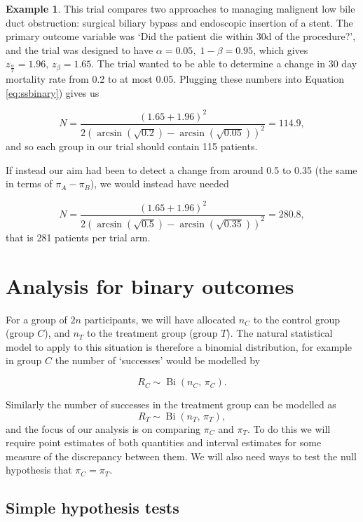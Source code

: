 \documentclass[
  openany]{book}
\theoremstyle{definition}
\theoremstyle{definition}
\newtheorem{example}{Example}[chapter]
\theoremstyle{definition}
\theoremstyle{definition}
\theoremstyle{remark}
\begin{document}
\begin{example}
\protect\hypertarget{exm:samplesize1}{}\label{exm:samplesize1}\citep[From][]{smith1994randomised}
This trial compares two approaches to managing malignent low bile duct obstruction: surgical biliary bypass and endoscopic insertion of a stent. The primary outcome variable was `Did the patient die within 30d of the procedure?', and the trial was designed to have \(\alpha=0.05,\;1-\beta=0.95\), which gives \(z_{\frac{\alpha}{2}}=1.96,\,z_{\beta} = 1.65\). The trial wanted to be able to determine a change in 30 day mortality rate from 0.2 to at most 0.05. Plugging these numbers into Equation \eqref{eq:ssbinary}) gives us

\[ N = \frac{\left(1.65 + 1.96\right)^2}{2\left(\arcsin{\left(\sqrt{0.2}\right)} - \arcsin{\left(\sqrt{0.05}\right)}\right)^2} = 114.9, \]
and so each group in our trial should contain 115 patients.

If instead our aim had been to detect a change from around 0.5 to 0.35 (the same in terms of \(\pi_A - \pi_B\)), we would instead have needed

\[ N = \frac{\left(1.65 + 1.96\right)^2}{2\left(\arcsin{\left(\sqrt{0.5}\right)} - \arcsin{\left(\sqrt{0.35}\right)}\right)^2} = 280.8 ,\]
that is 281 patients per trial arm.
\end{example}

\chapter{Analysis for binary outcomes}\label{binary-analysis}

For a group of \(2n\) participants, we will have allocated \(n_C\) to the control group (group \(C\)), and \(n_T\) to the treatment group (group \(T\)). The natural statistical model to apply to this situation is therefore a binomial distribution, for example in group \(C\) the number of `successes' would be modelled by

\[R_C \sim \operatorname{Bi}\left(n_C,\,\pi_C\right).\]

Similarly the number of successes in the treatment group can be modelled as
\[R_T \sim\operatorname{Bi}\left(n_T,\,\pi_T\right),\]
and the focus of our analysis is on comparing \(\pi_C\) and \(\pi_T\). To do this we will require point estimates of both quantities and interval estimates for some measure of the discrepancy between them. We will also need ways to test the null hypothesis that \(\pi_C = \pi_T.\)

\section{Simple hypothesis tests}\label{bin-point-est}
\end{document}
